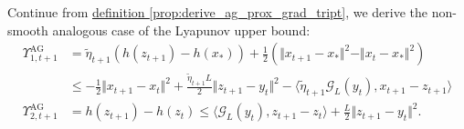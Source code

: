 \documentclass[12pt]{article}
\begin{document}
        \begin{lemma}
        \label{lemma:nsmooth_agg_lyapunov_upper_bound}
            Continue from 
            \hyperref[prop:derive_ag_prox_grad_tript]
            {definition \ref*{prop:derive_ag_prox_grad_tript}},
            we derive the non-smooth analogous case of the Lyapunov upper bound: 
            \begin{align*}
                \Upsilon_{1, t + 1}^\text{AG}
                &= 
                \tilde\eta_{t + 1} (h(z_{t + 1}) - h(x_*)) + 
                \frac{1}{2} (
                    \Vert x_{t + 1} - x_*\Vert^2
                    - 
                    \Vert x_t - x_*\Vert^2
                )
                \\
                &\le 
                - \frac{1}{2}\Vert x_{t + 1} - x_t\Vert^2 
                + \frac{\tilde\eta_{t + 1}L}{2}\Vert z_{t + 1} - y_t\Vert^2
                - \langle 
                    \tilde\eta_{t + 1} \mathcal G_L(y_t), 
                    x_{t + 1} - z_{t + 1}
                \rangle
                \\
                \Upsilon_{2, t + 1}^\text{AG}
                &= 
                h(z_{t + 1}) - h(z_t) 
                \le 
                \langle \mathcal G_L(y_t), z_{t + 1} - z_t\rangle + 
                \frac{L}{2}\Vert z_{t + 1} - y_t\Vert^2. 
            \end{align*}
        \end{lemma}
\end{document}
